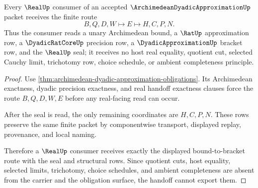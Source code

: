 \begin{theorem}
\label{thm:archimedean-dyadic-approximation-real-handoff}
Every $\RealUp$ consumer of an accepted $\ArchimedeanDyadicApproximationUp$ packet receives the finite route
$$
B,Q,D,W \longmapsto E \longmapsto H,C,P,N .
$$
Thus the consumer reads a unary Archimedean bound, a $\RatUp$ approximation row, a $\DyadicRatCoreUp$ precision row, a $\DyadicApproximationUp$ bracket row, and the $\RealUp$ seal; it receives no host real equality, quotient cut, selected Cauchy limit, trichotomy row, choice schedule, or ambient completeness principle.
\end{theorem}
\begin{proof}
Use \autoref{thm:archimedean-dyadic-approximation-obligations}. Its Archimedean exactness, dyadic precision exactness, and real handoff exactness clauses force the route $B,Q,D,W,E$ before any real-facing read can occur.

After the seal is read, the only remaining coordinates are $H,C,P,N$. These rows preserve the same finite packet by componentwise transport, displayed replay, provenance, and local naming.

Therefore a $\RealUp$ consumer receives exactly the displayed bound-to-bracket route with the seal and structural rows. Since quotient cuts, host equality, selected limits, trichotomy, choice schedules, and ambient completeness are absent from the carrier and the obligation surface, the handoff cannot export them.
\end{proof}


\begin{closurestatus}{\ArchimedeanDyadicApproximationUp}
  \theoryclosure{\seedClosure}
  \formalstatus{\unformalizedV}
\end{closurestatus}
